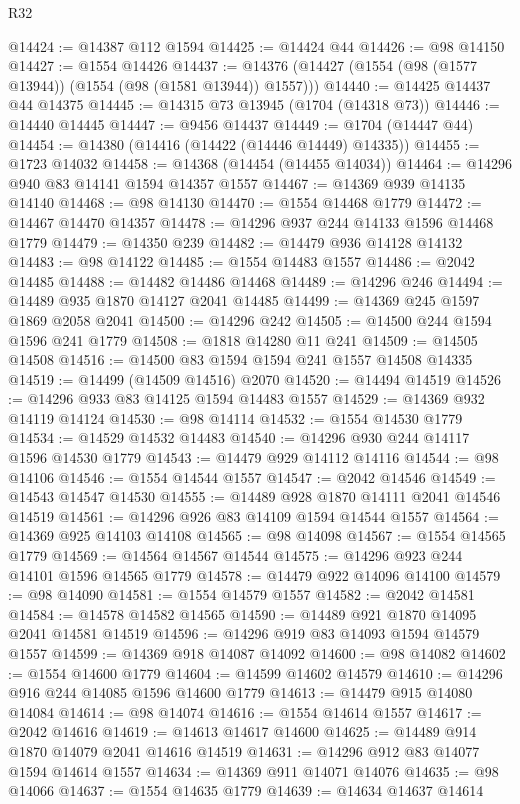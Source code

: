 \begin{lexlean}{R32}
\begin{coremodule}
@14424 := @14387 @112 @1594
@14425 := @14424 @44
@14426 := @98 @14150
@14427 := @1554 @14426
@14437 := @14376 (@14427 (@1554 (@98 (@1577 @13944)) (@1554 (@98 (@1581 @13944)) @1557)))
@14440 := @14425 @14437 @44 @14375
@14445 := @14315 @73 @13945 (@1704 (@14318 @73))
@14446 := @14440 @14445
@14447 := @9456 @14437
@14449 := @1704 (@14447 @44)
@14454 := @14380 (@14416 (@14422 (@14446 @14449) @14335))
@14455 := @1723 @14032
@14458 := @14368 (@14454 (@14455 @14034))
@14464 := @14296 @940 @83 @14141 @1594 @14357 @1557
@14467 := @14369 @939 @14135 @14140
@14468 := @98 @14130
@14470 := @1554 @14468 @1779
@14472 := @14467 @14470 @14357
@14478 := @14296 @937 @244 @14133 @1596 @14468 @1779
@14479 := @14350 @239
@14482 := @14479 @936 @14128 @14132
@14483 := @98 @14122
@14485 := @1554 @14483 @1557
@14486 := @2042 @14485
@14488 := @14482 @14486 @14468
@14489 := @14296 @246
@14494 := @14489 @935 @1870 @14127 @2041 @14485
@14499 := @14369 @245 @1597 @1869 @2058 @2041
@14500 := @14296 @242
@14505 := @14500 @244 @1594 @1596 @241 @1779
@14508 := @1818 @14280 @11 @241
@14509 := @14505 @14508
@14516 := @14500 @83 @1594 @1594 @241 @1557 @14508 @14335
@14519 := @14499 (@14509 @14516) @2070
@14520 := @14494 @14519
@14526 := @14296 @933 @83 @14125 @1594 @14483 @1557
@14529 := @14369 @932 @14119 @14124
@14530 := @98 @14114
@14532 := @1554 @14530 @1779
@14534 := @14529 @14532 @14483
@14540 := @14296 @930 @244 @14117 @1596 @14530 @1779
@14543 := @14479 @929 @14112 @14116
@14544 := @98 @14106
@14546 := @1554 @14544 @1557
@14547 := @2042 @14546
@14549 := @14543 @14547 @14530
@14555 := @14489 @928 @1870 @14111 @2041 @14546 @14519
@14561 := @14296 @926 @83 @14109 @1594 @14544 @1557
@14564 := @14369 @925 @14103 @14108
@14565 := @98 @14098
@14567 := @1554 @14565 @1779
@14569 := @14564 @14567 @14544
@14575 := @14296 @923 @244 @14101 @1596 @14565 @1779
@14578 := @14479 @922 @14096 @14100
@14579 := @98 @14090
@14581 := @1554 @14579 @1557
@14582 := @2042 @14581
@14584 := @14578 @14582 @14565
@14590 := @14489 @921 @1870 @14095 @2041 @14581 @14519
@14596 := @14296 @919 @83 @14093 @1594 @14579 @1557
@14599 := @14369 @918 @14087 @14092
@14600 := @98 @14082
@14602 := @1554 @14600 @1779
@14604 := @14599 @14602 @14579
@14610 := @14296 @916 @244 @14085 @1596 @14600 @1779
@14613 := @14479 @915 @14080 @14084
@14614 := @98 @14074
@14616 := @1554 @14614 @1557
@14617 := @2042 @14616
@14619 := @14613 @14617 @14600
@14625 := @14489 @914 @1870 @14079 @2041 @14616 @14519
@14631 := @14296 @912 @83 @14077 @1594 @14614 @1557
@14634 := @14369 @911 @14071 @14076
@14635 := @98 @14066
@14637 := @1554 @14635 @1779
@14639 := @14634 @14637 @14614

\end{coremodule}
\end{lexlean}
